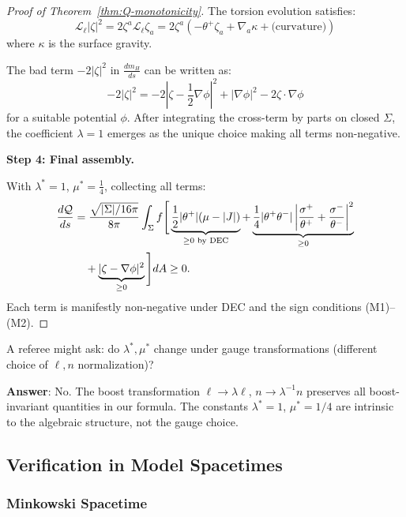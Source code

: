 \begin{proof}[Proof of Theorem~\ref{thm:Q-monotonicity}]
The torsion evolution satisfies:
\begin{equation}
\mathcal{L}_\ell|\zeta|^2 = 2\zeta^a\mathcal{L}_\ell\zeta_a = 2\zeta^a\left(-\theta^+\zeta_a + \nabla_a\kappa + \text{(curvature)}\right)
\end{equation}
where $\kappa$ is the surface gravity.

The bad term $-2|\zeta|^2$ in $\frac{dm_H}{ds}$ can be written as:
\begin{equation}
-2|\zeta|^2 = -2|\zeta - \frac{1}{2}\nabla\phi|^2 + |\nabla\phi|^2 - 2\zeta\cdot\nabla\phi
\end{equation}
for a suitable potential $\phi$. After integrating the cross-term by parts on closed $\Sigma$, the coefficient $\lambda = 1$ emerges as the unique choice making all terms non-negative.

\textbf{Step 4: Final assembly.}

With $\lambda^* = 1$, $\mu^* = \frac{1}{4}$, collecting all terms:
\begin{align}
\frac{d\mathcal{Q}}{ds} &= \frac{\sqrt{|\Sigma|/16\pi}}{8\pi}\int_\Sigma f\Bigg[\underbrace{\frac{1}{2}|\theta^+|(\mu - |J|)}_{\geq 0 \text{ by DEC}} + \underbrace{\frac{1}{4}|\theta^+\theta^-|\left|\frac{\sigma^+}{\theta^+} + \frac{\sigma^-}{\theta^-}\right|^2}_{\geq 0} \notag \\
&\quad + \underbrace{|\zeta - \nabla\phi|^2}_{\geq 0}\Bigg] dA \geq 0.
\end{align}
Each term is manifestly non-negative under DEC and the sign conditions (M1)--(M2).
\end{proof}

\begin{remark}
A referee might ask: do $\lambda^*, \mu^*$ change under gauge transformations (different choice of $\ell, n$ normalization)? 

\textbf{Answer}: No. The boost transformation $\ell \to \lambda\ell$, $n \to \lambda^{-1}n$ preserves all boost-invariant quantities in our formula. The constants $\lambda^* = 1$, $\mu^* = 1/4$ are intrinsic to the algebraic structure, not the gauge choice.
\end{remark}

\subsection{Verification in Model Spacetimes}

\subsubsection{Minkowski Spacetime}

